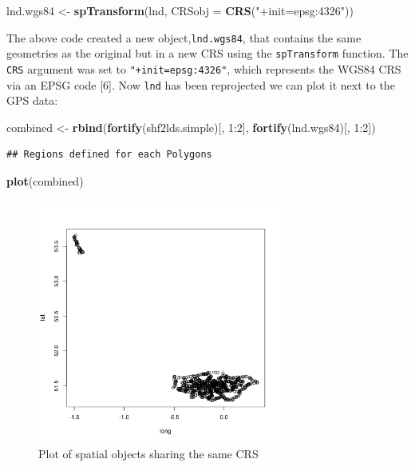 \documentclass[]{article}
\newenvironment{Shaded}{}{}
\newcommand{\KeywordTok}[1]{\textcolor[rgb]{0.00,0.44,0.13}{\textbf{{#1}}}}
\newcommand{\DataTypeTok}[1]{\textcolor[rgb]{0.56,0.13,0.00}{{#1}}}
\newcommand{\DecValTok}[1]{\textcolor[rgb]{0.25,0.63,0.44}{{#1}}}
\newcommand{\StringTok}[1]{\textcolor[rgb]{0.25,0.44,0.63}{{#1}}}
\newcommand{\NormalTok}[1]{{#1}}
\let\Oldincludegraphics\includegraphics
\renewcommand{\includegraphics}[1]{\Oldincludegraphics[width=8cm]{#1}}
\begin{document}
\begin{Shaded}
\begin{Highlighting}[]
\NormalTok{lnd.wgs84 <- }\KeywordTok{spTransform}\NormalTok{(lnd, }\DataTypeTok{CRSobj =} \KeywordTok{CRS}\NormalTok{(}\StringTok{"+init=epsg:4326"}\NormalTok{))}
\end{Highlighting}
\end{Shaded}
The above code created a new object,\texttt{lnd.wgs84}, that contains
the same geometries as the original but in a new CRS using the
\texttt{spTransform} function. The \texttt{CRS} argument was set to
\texttt{"+init=epsg:4326"}, which represents the WGS84 CRS via an EPSG
code {[}6{]}. Now \texttt{lnd} has been reprojected we can plot it next
to the GPS data:

\begin{Shaded}
\begin{Highlighting}[]
\NormalTok{combined <- }\KeywordTok{rbind}\NormalTok{(}\KeywordTok{fortify}\NormalTok{(shf2lds.simple)[, }\DecValTok{1}\NormalTok{:}\DecValTok{2}\NormalTok{], }\KeywordTok{fortify}\NormalTok{(lnd.wgs84)[, }\DecValTok{1}\NormalTok{:}\DecValTok{2}\NormalTok{])}
\end{Highlighting}
\end{Shaded}
\begin{verbatim}
## Regions defined for each Polygons
\end{verbatim}
\begin{Shaded}
\begin{Highlighting}[]
\KeywordTok{plot}\NormalTok{(combined)}
\end{Highlighting}
\end{Shaded}
\begin{figure}[htbp]
\centering
\includegraphics{figure/Plot_of_spatial_objects_sharing_the_same_CRS.png}
\caption{Plot of spatial objects sharing the same CRS}
\end{figure}
\end{document}
